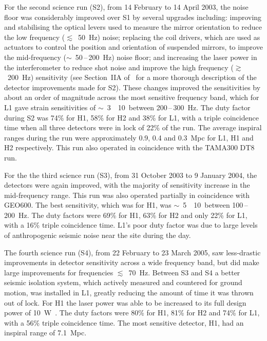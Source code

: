 For the second science run (S2), from 14 February to 14 April 2003, the noise floor was considerably improved 
over S1 by several upgrades including: improving and stabilising the optical levers used to measure the 
mirror orientation to reduce the low frequency ($\lesssim$~50~Hz) noise; replacing the coil drivers, which 
are used as actuators to control the position and orientation of suspended mirrors, to improve the
mid-frequency ($\sim$~50\,--\,200~Hz) noise floor; and increasing the laser power in the interferometer to 
reduce shot noise and improve the high frequency ($\gtrsim$~200~Hz) sensitivity (see Section~IIA 
of~\cite{Abbott:2005a} for a more thorough description of the detector improvements made for S2). These 
changes improved the sensitivities by about an order of magnitude across the most sensitive frequency band, 
which for L1 gave strain sensitivities of $\sim$~3~\texttimes~10~\Hz between 200\,--\,300~Hz. The 
duty factor during S2 was 74\% for H1, 58\% for H2 and 38\% for L1, with a triple coincidence time when all 
three detectors were in lock of 22\% of the run. The average inspiral ranges during the run were approximately 
0.9, 0.4 and 0.3~Mpc for L1, H1 and H2 respectively. This run also operated in coincidence with the TAMA300 
DT8 run. 

For the the third science run (S3), from 31 October 2003 to 9 January 2004, the detectors were again 
improved, with the majority of sensitivity increase in the mid-frequency range. This run was also operated 
partially in coincidence with GEO600. The best sensitivity, which was for H1, was
$\sim$~5~\texttimes~10~\Hz between 100\,--\,200~Hz. The duty factors were 69\% for H1, 63\% for H2 
and only 22\% for L1, with a 16\% triple coincidence time. L1's poor duty factor was due to large levels of 
anthropogenic seismic noise near the site during the day.

The fourth science run (S4), from 22 February to 23 March 2005, saw less-drastic improvements in detector 
sensitivity across a wide frequency band, but did make large improvements for frequencies $\lesssim$~70~Hz. 
Between S3 and S4 a better seismic isolation system, which actively measured and countered for ground
motion, was installed in L1, greatly reducing the amount of time it was thrown out of lock. For H1 the laser 
power was able to be increased to its full design power of 10~W~\cite{Abbott:2007b}. The duty factors were 
80\% for H1, 81\% for H2 and 74\% for L1, with a 56\% triple coincidence time. The most sensitive
detector, H1, had an inspiral range of 7.1~Mpc.

